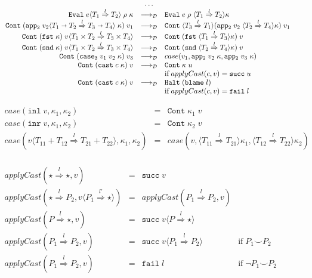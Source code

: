 \documentclass[acmsmall,review,anonymous]{acmart}\settopmatter{printfolios=true,printccs=false,printacmref=false}
\newcommand{\funrule}[3]{#1 &=& #2 & #3\\}
\newcommand{\plus}[0]{+}
\newcommand{\sOOinspect}[3]{\mathtt{Eval} \; #1 \; #2 \; #3}
\newcommand{\sOOreturn}[2]{\mathtt{Cont} \; #2 \; #1}
\newcommand{\sOOhalt}[1]{\mathtt{Halt} \; #1}
\newcommand{\POOfun}[2]{#1 \shortrightarrow #2}
\newcommand{\POOprod}[2]{#1 \times #2}
\newcommand{\POOsum}[2]{#1 \plus #2}
\newcommand{\eOOcast}[4]{#1 \langle \cOOcast{#2}{#3}{#4} \rangle}
\newcommand{\oOOblame}[1]{\mathtt{blame} \; #1}
\newcommand{\cOOcast}[3]{#1 \overset{#2}{\Rightarrow} #3}
\newcommand{\vOOcast}[2]{#1\langle#2\rangle}
\newcommand{\vOOfun}[3]{\mathtt{fun} \; #1 \; #2 \; #3}
\newcommand{\vOOinl}[1]{\mathtt{inl}\;#1}
\newcommand{\vOOinr}[1]{\mathtt{inr}\;#1}
\newcommand{\rOOsucc}[1]{\mathtt{succ}\;#1}
\newcommand{\rOOfail}[1]{\mathtt{fail}\;#1}
\newcommand{\sidecond}[1]{\text{if}\;#1}
\newcommand{\redrule}[3]{#1 & \longrightarrow_\mathcal{D} & #2 & #3\\}
\begin{document}
\begin{figure}
\[\begin{array}{rclr}
	& \dots  \\
	\redrule{
		\sOOinspect{\eOOcast{e}{T_1}{l}{T_2}}{\rho}{\kappa}
	}{
		\sOOinspect{e}{\rho}{\langle\cOOcast{T_1}{l}{T_2}\rangle\kappa}
	}{}
	\redrule{
		\sOOreturn{v_1}{(\mathtt{app_2} \; \vOOcast{v_2}{
				\cOOcast{\POOfun{T_1}{T_2}}{l}{\POOfun{T_3}{T_4}}
			} \; \kappa)}
	}{
		\sOOreturn{v_1}{
		\langle\cOOcast{T_3}{l}{T_1}\rangle
		(\mathtt{app_2} \; v_2 \; 
		\langle\cOOcast{T_2}{l}{T_4}\rangle \kappa)}
	}{}
	

	\redrule{
		\sOOreturn{
			\vOOcast{v}{\cOOcast{\POOprod{T_1}{T_2}}{l}{
					\POOprod{T_3}{T_4}}}
			}{(\mathtt{fst} \; \kappa)}
	}{
		\sOOreturn{v}{(
			\mathtt{fst} \;
			\langle \cOOcast{T_1}{l}{T_3} \rangle \kappa
			)}
	}{}

	\redrule{
		\sOOreturn{
			\vOOcast{v}{\cOOcast{\POOprod{T_1}{T_2}}{l}{
					\POOprod{T_3}{T_4}}}
		}{(\mathtt{snd} \; \kappa)}
	}{
		\sOOreturn{v}{(
			\mathtt{snd} \;
			\langle \cOOcast{T_2}{l}{T_4} \rangle \kappa
			)}
	}{}

	\redrule{
		\sOOreturn{v_3}{(
			\mathtt{case_3} \;
			v_1 \; v_2 \;
			\kappa
		)}
	}{case(v_1,
	\mathtt{app_2} \; v_2 \; \kappa,
	\mathtt{app_2} \; v_3 \; \kappa
	)}{}

	\redrule{
		\sOOreturn{v}{(
			\mathtt{cast} \; c \; \kappa
		)}
	}{
		\sOOreturn{u}{\kappa}
		\\ &
	}{
		\sidecond{applyCast(c,v) = \rOOsucc{u}}
	}

	\redrule{
		\sOOreturn{v}{(
			\mathtt{cast} \; c \; \kappa
			)}
	}{
		\sOOhalt{(\oOOblame{l})}
		\\ &
	}{
		\sidecond{applyCast(c,v) = \rOOfail{l}}
	}
	\end{array}
	\]	
	
	\[
	\begin{array}{rclr}
	\funrule{case(\vOOinl{v},\kappa_1,\kappa_2)}{
		\sOOreturn{v}{\kappa_1}
	}{}
	\funrule{case(\vOOinr{v},\kappa_1,\kappa_2)}{
		\sOOreturn{v}{\kappa_2}
	}{}
	\funrule{case(\vOOcast{v}{\cOOcast{\POOsum{T_{11}}{T_{12}}}{l}{\POOsum{T_{21}}{T_{22}}}},\kappa_1,\kappa_2)}{
		case(v,
		\langle \cOOcast{T_{11}}{l}{T_{21}} \rangle \kappa_1,
		\langle \cOOcast{T_{12}}{l}{T_{22}} \rangle \kappa_2)
	}{}
	\end{array}
	\]
	
	\[
	\begin{array}{rclr}
	\funrule{
		applyCast(\cOOcast{\star}{l}{\star},v)
	}{
		\rOOsucc{v}
	}{}
	\funrule{
		applyCast(\cOOcast{\star}{l}{P_2},\vOOcast{v}{\cOOcast{P_1}{l'}{\star}})
	}{
		applyCast(\cOOcast{P_1}{l}{P_2},v)
	}{}
	\funrule{
		applyCast(\cOOcast{P}{l}{\star},v)
	}{
		\rOOsucc{\vOOcast{v}{\cOOcast{P}{l}{\star}}}
	}{}
	\funrule{
		applyCast(\cOOcast{P_1}{l}{P_2},v)
	}{
		\rOOsucc{\vOOcast{v}{\cOOcast{P_1}{l}{P_2}}}
	}{\sidecond{P_1 \smile P_2}}
	\funrule{
		applyCast(\cOOcast{P_1}{l}{P_2},v)
	}{
		\rOOfail{l}
	}{\sidecond{\neg P_1 \smile P_2}}
	

\end{array}\]
\end{figure}
\end{document}
